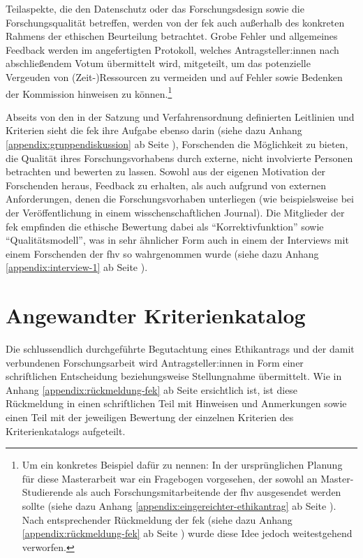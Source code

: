 \documentclass[a4paper,12pt,twoside,numbers=noendperiod]{scrreprt}
\begin{document}
Teilaspekte, die den Datenschutz oder das Forschungsdesign sowie die Forschungsqualität betreffen, werden von der \ac{fek} auch außerhalb des konkreten Rahmens der ethischen Beurteilung betrachtet. Grobe Fehler und allgemeines Feedback werden im angefertigten Protokoll, welches Antragsteller:innen nach abschließendem Votum übermittelt wird, mitgeteilt, um das potenzielle Vergeuden von (Zeit-)Ressourcen zu vermeiden und auf Fehler sowie Bedenken der Kommission hinweisen zu können.\footnote{Um ein konkretes Beispiel dafür zu nennen: In der ursprünglichen Planung für diese Masterarbeit war ein Fragebogen vorgesehen, der sowohl an Master-Studierende als auch Forschungsmitarbeitende der \ac{fhv} ausgesendet werden sollte (siehe dazu Anhang \ref{appendix:eingereichter-ethikantrag} ab Seite \pageref{appendix:eingereichter-ethikantrag}). Nach entsprechender Rückmeldung der \ac{fek} (siehe dazu Anhang \ref{appendix:rückmeldung-fek} ab Seite \pageref{appendix:rückmeldung-fek}) wurde diese Idee jedoch weitestgehend verworfen.\label{footnote:ursprüngliche-planung-leitfaden}} \cite[1\psq]{forschungsethik-kommission_der_fachhochschule_vorarlberg_verfahrensordnung_2020}

\medskip

Abseits von den in der Satzung und Verfahrensordnung definierten Leitlinien und Kriterien sieht die \ac{fek} ihre Aufgabe ebenso darin (siehe dazu Anhang \ref{appendix:gruppendiskussion} ab Seite \pageref{appendix:gruppendiskussion}), Forschenden die Möglichkeit zu bieten, die Qualität ihres Forschungsvorhabens durch externe, nicht involvierte Personen betrachten und bewerten zu lassen. Sowohl aus der eigenen Motivation der Forschenden heraus, Feedback zu erhalten, als auch aufgrund von externen Anforderungen, denen die Forschungsvorhaben unterliegen (wie beispielsweise bei der Veröffentlichung in einem wisschenschaftlichen Journal). Die Mitglieder der \ac{fek} empfinden die ethische Bewertung dabei als \enquote{Korrektivfunktion} sowie \enquote{Qualitätsmodell}, was in sehr ähnlicher Form auch in einem der Interviews mit einem Forschenden der \ac{fhv} so wahrgenommen wurde (siehe dazu Anhang \ref{appendix:interview-1} ab Seite \pageref{appendix:interview-1}).

\section{Angewandter Kriterienkatalog}
\label{sec:angewandter-kriterienkatalog}

Die schlussendlich durchgeführte Begutachtung eines Ethikantrags und der damit verbundenen Forschungsarbeit wird Antragsteller:innen in Form einer schriftlichen Entscheidung beziehungsweise Stellungnahme übermittelt. \cite[4]{forschungsethik-kommission_der_fachhochschule_vorarlberg_verfahrensordnung_2020} Wie in Anhang \ref{appendix:rückmeldung-fek} ab Seite \pageref{appendix:rückmeldung-fek} ersichtlich ist, ist diese Rückmeldung in einen schriftlichen Teil mit Hinweisen und Anmerkungen sowie einen Teil mit der jeweiligen Bewertung der einzelnen Kriterien des Kriterienkatalogs aufgeteilt.
\end{document}
